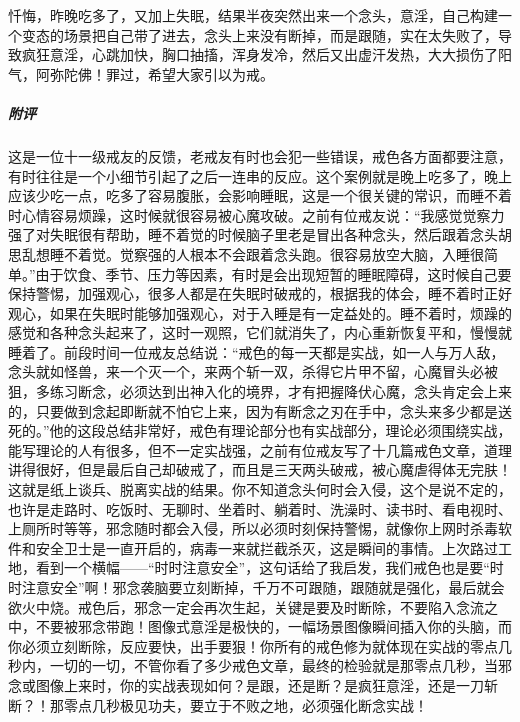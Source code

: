 \begin{case}
    忏悔，昨晚吃多了，又加上失眠，结果半夜突然出来一个念头，意淫，自己构建一个变态的场景把自己带了进去，念头上来没有断掉，而是跟随，实在太失败了，导致疯狂意淫，心跳加快，胸口抽搐，浑身发冷，然后又出虚汗发热，大大损伤了阳气，阿弥陀佛！罪过，希望大家引以为戒。
    \subparagraph{附评} 这是一位十一级戒友的反馈，老戒友有时也会犯一些错误，戒色各方面都要注意，有时往往是一个小细节引起了之后一连串的反应。这个案例就是晚上吃多了，晚上应该少吃一点，吃多了容易腹胀，会影响睡眠，这是一个很关键的常识，而睡不着时心情容易烦躁，这时候就很容易被心魔攻破。之前有位戒友说：“我感觉觉察力强了对失眠很有帮助，睡不着觉的时候脑子里老是冒出各种念头，然后跟着念头胡思乱想睡不着觉。觉察强的人根本不会跟着念头跑。很容易放空大脑，入睡很简单。”由于饮食、季节、压力等因素，有时是会出现短暂的睡眠障碍，这时候自己要保持警惕，加强观心，很多人都是在失眠时破戒的，根据我的体会，睡不着时正好观心，如果在失眠时能够加强观心，对于入睡是有一定益处的。睡不着时，烦躁的感觉和各种念头起来了，这时一观照，它们就消失了，内心重新恢复平和，慢慢就睡着了。前段时间一位戒友总结说：“戒色的每一天都是实战，如一人与万人敌，念头就如怪兽，来一个灭一个，来两个斩一双，杀得它片甲不留，心魔冒头必被狙，多练习断念，必须达到出神入化的境界，才有把握降伏心魔，念头肯定会上来的，只要做到念起即断就不怕它上来，因为有断念之刃在手中，念头来多少都是送死的。”他的这段总结非常好，戒色有理论部分也有实战部分，理论必须围绕实战，能写理论的人有很多，但不一定实战强，之前有位戒友写了十几篇戒色文章，道理讲得很好，但是最后自己却破戒了，而且是三天两头破戒，被心魔虐得体无完肤！这就是纸上谈兵、脱离实战的结果。你不知道念头何时会入侵，这个是说不定的，也许是走路时、吃饭时、无聊时、坐着时、躺着时、洗澡时、读书时、看电视时、上厕所时等等，邪念随时都会入侵，所以必须时刻保持警惕，就像你上网时杀毒软件和安全卫士是一直开启的，病毒一来就拦截杀灭，这是瞬间的事情。上次路过工地，看到一个横幅——“时时注意安全”，这句话给了我启发，我们戒色也是要“时时注意安全”啊！邪念袭脑要立刻断掉，千万不可跟随，跟随就是强化，最后就会欲火中烧。戒色后，邪念一定会再次生起，关键是要及时断除，不要陷入念流之中，不要被邪念带跑！图像式意淫是极快的，一幅场景图像瞬间插入你的头脑，而你必须立刻断除，反应要快，出手要狠！你所有的戒色修为就体现在实战的零点几秒内，一切的一切，不管你看了多少戒色文章，最终的检验就是那零点几秒，当邪念或图像上来时，你的实战表现如何？是跟，还是断？是疯狂意淫，还是一刀斩断？！那零点几秒极见功夫，要立于不败之地，必须强化断念实战！
\end{case}

